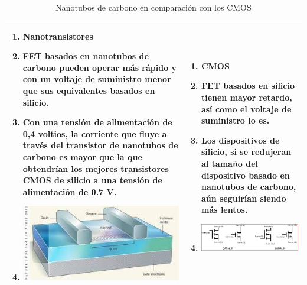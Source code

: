 \documentclass[aspectratio=169, 8pt]{beamer}
\begin{document}
\begin{frame}
\begin{table}
	\centering
	\begin{tabular}{|p{}|p{}|}
		\hline
		\begin{enumerate}
			\item[]\textbf{Nanotransistores}
			\item FET basados en nanotubos de carbono pueden operar más rápido y con un
			voltaje de suministro menor que sus equivalentes basados en silicio.
			\item Con una tensión de alimentación de 0,4 voltios, la corriente que fluye a través del transistor de nanotubos de carbono es mayor que la que obtendrían los mejores transistores CMOS de silicio a una tensión de alimentación de 0.7 V.
			\vspace{3mm}
			\item[] \hspace{10mm}\includegraphics[scale=0.3]{IMAGENES/image1.jpg}
		\end{enumerate} &
		\begin{enumerate}
			\item[]\textbf{CMOS}
			\item FET basados en silicio tienen mayor retardo, así como el voltaje de
			suministro lo es.
			\item Los dispositivos de silicio, si se redujeran al tamaño del dispositivo
			basado en nanotubos de carbono, aún seguirían siendo más lentos. 
			\vspace{3mm}
			\item[] \hspace*{10mm}\includegraphics[scale=0.3]{IMAGENES/2.png}
		\end{enumerate}\\
		\hline
	\end{tabular}
	\caption{Nanotubos de carbono en comparación con los CMOS}
\end{table}
\end{frame}
\end{document}
